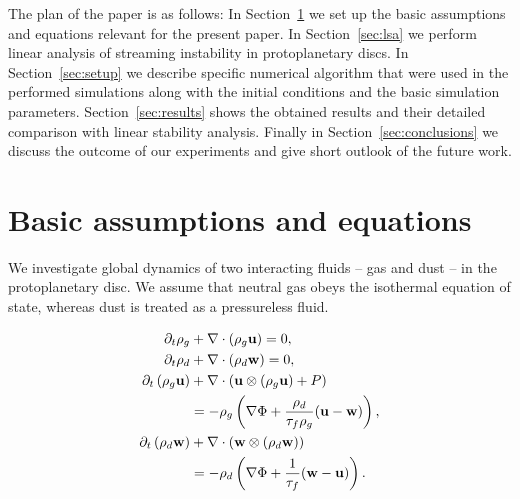 The plan of the paper is as follows: In Section~\ref{sec:eqs} we set up the
basic assumptions and equations relevant for the present paper. In
Section~\ref{sec:lsa} we perform linear analysis of streaming instability in
protoplanetary discs. In Section~\ref{sec:setup} we describe specific numerical
algorithm that were used in the performed simulations along with the initial
conditions and the basic simulation parameters. Section~\ref{sec:results} shows
the obtained results and their detailed comparison with linear stability
analysis.  Finally in Section~\ref{sec:conclusions} we discuss the outcome of
our experiments and give short outlook of the future work.

\section{Basic assumptions and equations}
\label{sec:eqs}

We investigate global dynamics of two interacting fluids -- gas and dust -- in
the protoplanetary disc. We assume that neutral gas obeys the isothermal
equation of state, whereas dust is treated as a pressureless fluid.

\begin{align}
\partial_t \rho_g &+ \nabla\cdot\left(\rho_g\mathbf{u}\right) = 0,\\
\partial_t \rho_d &+ \nabla\cdot\left(\rho_d\mathbf{w}\right) = 0,\\
\partial_t \left(\rho_g\mathbf{u}\right) &+
   \nabla\cdot(\mathbf{u}\otimes(\rho_g\mathbf{u})+P) \notag\\
 &= -\rho_g\left(\nabla\Phi +
\frac{\rho_d}{\tau_f\rho_g}(\mathbf{u}-\mathbf{w})\right),\label{eq3}\\
\partial_t \left(\rho_d\mathbf{w}\right) &+
\nabla\cdot(\mathbf{w}\otimes(\rho_d\mathbf{w})) \notag\\
 &= -\rho_d\left(\nabla\Phi + \frac{1}{\tau_f}(\mathbf{w}-\mathbf{u})\right)
\label{eq4}.
\end{align}

